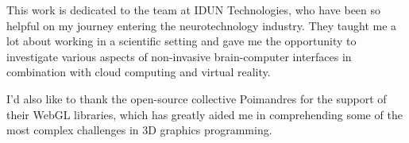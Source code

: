 \begin{dedication}

  This work is dedicated to the team at IDUN Technologies, who have been so helpful on my journey entering the neurotechnology industry. They taught me a lot about working in a scientific setting and gave me the opportunity to investigate various aspects of non-invasive brain-computer interfaces in combination with cloud computing and virtual reality.

  I'd also like to thank the open-source collective Poimandres for the support of their WebGL libraries, which has greatly aided me in comprehending some of the most complex challenges in 3D graphics programming.

\end{dedication}
